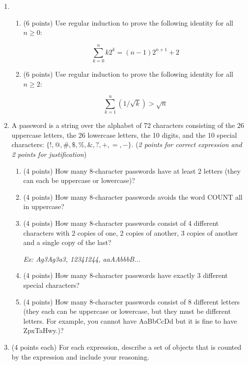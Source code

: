 \documentclass[10pt,letterpaper,unboxed,cm]{article}
\begin{document}
\begin{enumerate}

\item
\begin{enumerate}
\item (6 points)
Use regular induction to prove the following identity for all $n\geq 0$:

$$\sum_{k=0}^n k2^k = (n-1)2^{n+1} + 2$$

\item (6 points)
Use regular induction to prove the following identity for all $n\geq 2$:

$$\sum_{k=1}^n \left(1/\sqrt{k}\right) > \sqrt{n}$$
\end{enumerate}


\item
A password is a string over the alphabet of 72 characters consisting of the 26 uppercase letters, the 26 lowercase letters, the 10 digits, and the 10 special characters: $\{!,@,\#,\$,\%,\&,?,+,=,-\}$. (\emph{2 points for correct expression and 2 points for justification})

\begin{enumerate}


\item
(4 points)
How many 8-character passwords have at least 2 letters (they can each be uppercase or lowercase)?

\item
(4 points)
How many 8-character passwords avoids the word COUNT all in uppercase?


\item
(4 points)
How many 8-character passwords consist of 4 different characters with 2 copies of one, 2 copies of another, 3 copies of another and a single copy of the last?

\emph{Ex: Ag3Ag3a3, 12341244, aaAAbbbB...}

\item
(4 points)
How many 8-character passwords have exactly 3 different special characters?

\item
(4 points)
How many 8-character passwords consist of 8 different letters (they each can be uppercase or lowercase, but they must be different letters. For example, you cannot have AaBbCcDd but it is fine to have ZpxTaHwy.)?

\end{enumerate}

    \item (4 points each) For each expression, describe a set of objects that is counted by the expression and include your reasoning.


\end{enumerate}
\end{document}
